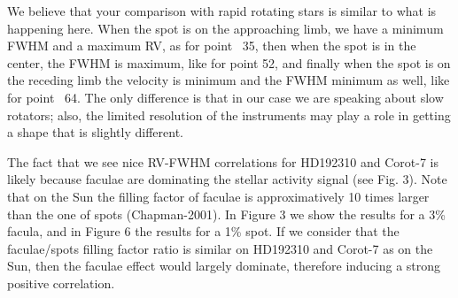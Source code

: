 \documentclass[11pt]{article}   	%
\begin{document}
\begin{enumerate}
{We believe that your comparison with rapid rotating stars is similar to what is happening here. When the spot is on the approaching limb, we have a minimum FWHM and a maximum RV, as for point ~35, then when the spot is in the center, the FWHM is maximum, like for point 52, and finally when the spot is on the receding limb the velocity is minimum and the FWHM minimum as well, like for point ~64. The only difference is that in our case we are speaking about slow rotators; also, the limited resolution of the instruments may play a role in getting a shape that is slightly different.

The fact that we see nice RV-FWHM correlations for HD192310 and Corot-7 is likely because faculae are dominating the stellar activity signal (see Fig. 3). Note that on the Sun the filling factor of faculae is approximatively 10 times larger than the one of spots (Chapman-2001). In Figure 3 we show the results for a 3\% facula, and in Figure 6 the results for a 1\% spot. If we consider that the faculae/spots filling factor ratio is similar on HD192310 and Corot-7 as on the Sun, then the faculae effect would largely dominate, therefore inducing a strong positive correlation.}



\end{enumerate}
\end{document}
